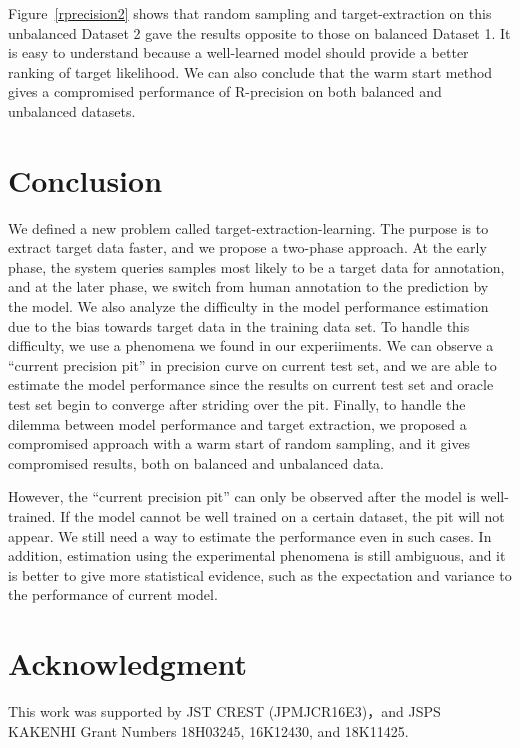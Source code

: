 \documentclass{deime}
\begin{document}
Figure~\ref{rprecision2} shows that random sampling and
target-extraction on this unbalanced Dataset 2 gave the results
opposite to those on balanced Dataset 1.  It is easy to understand
because a well-learned model should provide a better ranking of target
likelihood.  We can also conclude that the warm start method gives a
compromised performance of R-precision on both balanced and unbalanced
datasets.

\section{Conclusion}

We defined a new problem called target-extraction-learning. The
purpose is to extract target data faster, and we propose a two-phase
approach. At the early phase, the system queries samples most likely
to be a target data for annotation, and at the later phase, we switch
from human annotation to the prediction by the model. We also analyze
the difficulty in the model performance estimation due to the bias
towards target data in the training data set. To handle this
difficulty, we use a phenomena we found in our experiiments. We can
observe a ``current precision pit'' in precision curve on current test
set, and we are able to estimate the model performance since the
results on current test set and oracle test set begin to converge
after striding over the pit. Finally, to handle the dilemma between
model performance and target extraction, we proposed a compromised
approach with a warm start of random sampling, and it gives
compromised results, both on balanced and unbalanced data.

However, the ``current precision pit'' can only be observed after the
model is well-trained.  If the model cannot be well trained on a
certain dataset, the pit will not appear.  We still need a way to
estimate the performance even in such cases.  In addition, estimation
using the experimental phenomena is still ambiguous, and it is better
to give more statistical evidence, such as the expectation and
variance to the performance of current model.

\section{Acknowledgment}

This work was supported by JST CREST (JPMJCR16E3)，and JSPS KAKENHI Grant
Numbers 18H03245, 16K12430, and 18K11425.

\vspace{2em}
\end{document}
